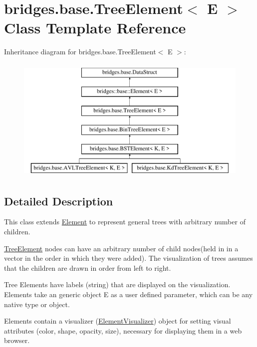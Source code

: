 \hypertarget{classbridges_1_1base_1_1_tree_element}{}\section{bridges.\+base.\+Tree\+Element$<$ E $>$ Class Template Reference}
\label{classbridges_1_1base_1_1_tree_element}
Inheritance diagram for bridges.\+base.\+Tree\+Element$<$ E $>$\+:\begin{figure}[H]
\begin{center}
\leavevmode
\includegraphics[height=6.000000cm]{classbridges_1_1base_1_1_tree_element}
\end{center}
\end{figure}


\subsection{Detailed Description}
This class extends \mbox{\hyperlink{classbridges_1_1base_1_1_element}{Element}} to represent general trees with arbitrary number of children. 

\mbox{\hyperlink{classbridges_1_1base_1_1_tree_element}{Tree\+Element}} nodes can have an arbitrary number of child nodes(held in in a vector in the order in which they were added). The visualization of trees assumes that the children are drawn in order from left to right.

Tree Elements have labels (string) that are displayed on the visualization. Elements take an generic object E as a user defined parameter, which can be any native type or object.

Elements contain a visualizer (\mbox{\hyperlink{classbridges_1_1base_1_1_element_visualizer}{Element\+Visualizer}}) object for setting visual attributes (color, shape, opacity, size), necessary for displaying them in a web browser.

